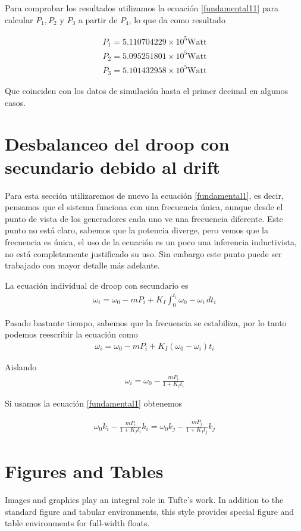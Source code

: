 \documentclass{tufte-handout}
\newcommand{\docenv}[1]{\textsf{#1}}%
\begin{document}
Para comprobar los resultados utilizamos la ecuación \ref{fundamental11} para calcular $P_1,P_2$ y $P_3$ a partir de $P_4$, lo que da como resultado

\begin{align}
    P_1=5.110704229\times10^5 \text{Watt} \\
    P_2=5.095251801\times10^5 \text{Watt}\\
    P_3=5.101432958\times10^5  \text{Watt}
\end{align}

Que coinciden con los datos de simulación hasta el primer decimal en algunos casos.

\section{Desbalanceo del droop con secundario debido al drift}
Para esta sección utilizaremos de nuevo la ecuación \ref{fundamental1}, es decir, pensamos que el sistema funciona con una frecuencia única, aunque desde el punto de vista de los generadores cada uno ve una frecuencia diferente. Este punto no está claro, sabemos que la potencia diverge, pero vemos que la frecuencia es única, el uso de la ecuación es un poco una inferencia inductivista, no está completamente justificado su uso. Sin embargo este punto puede ser trabajado con mayor detalle más adelante.

La ecuación individual de droop con secundario es
\begin{align}
    \omega_i=\omega_0-mP_i+K_I\int_0^{t_i}\omega_0-\omega_i\, dt_i
\end{align}

Pasado bastante tiempo, sabemos que la frecuencia se estabiliza, por lo tanto podemos reescribir la ecuación como
\begin{align}
    \omega_i=\omega_0-mP_i+K_I(\omega_0-\omega_i)t_i
\end{align}

Aislando
\begin{align}
    \omega_i=\omega_0-\frac{mP_i}{1+K_It_i}
\end{align}

Si usamos la ecuación \ref{fundamental1} obtenemos

\begin{align}
    \omega_0k_i-\frac{mP_i}{1+K_It_i}k_i=\omega_0k_j-\frac{mP_j}{1+K_It_j}k_j
\end{align}




\section{Figures and Tables}\label{sec:figures-and-tables}
Images and graphics play an integral role in Tufte's work.
In addition to the standard \docenv{figure} and \docenv{tabular} environments,
this style provides special figure and table environments for full-width
floats.
\end{document}
